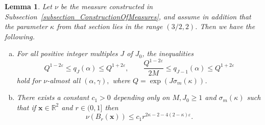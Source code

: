 \documentclass[12pt, reqno]{amsart}
\newtheorem{lemma}[thm]{Lemma}
\theoremstyle{definition}
\theoremstyle{remark}
\numberwithin{equation}{section}
\def\alp{{\alpha}} \def\bfalp{{\boldsymbol \alpha}}
\def\gam{{\gamma}} \def\Gam{{\Gamma}}
\def\kap{{\kappa}}
\def\sig{{\sigma}} \def\Sig{{\Sigma}} \def\bfsig{{\boldsymbol \sig}}
\def\eps{\varepsilon}
\def\le{\leqslant} \def\ge{\geqslant}
\def\ls{\leqslant} \def\gs{\geqslant}
\def \sig{{\sigma}}
\def \bR {\mathbb R}
\def \bx {\mathbf x}
\begin{document}
\begin{lemma} \label{lem_FD}  Let $\nu$ be the measure constructed in Subsection~\ref{subsection_ConstructionOfMeasures}, and assume in addition that the parameter $\kap$ from that section lies in the range $(3/2,2)$. Then we have the following.

\begin{enumerate}[(a)]
\item \label{point_sizeQJ} For all positive integer multiples $J$ of $J_0$, the inequalities
\begin{equation} \label{denominator_bounds}
	Q^{1-2\eps} \le q_J(\alp) \le Q^{1+2\eps},
	\qquad
	\frac{Q^{1-2\eps}}{2M}
	\le q_{J-1}(\alp) \le Q^{1+2\eps} 
\end{equation}
hold for $\nu$-almost all $(\alp,\gam),$ where $Q = \exp(J \sig_m(\kap))$.

\item \label{point_dimFrostman} There exists a constant $c_1>0$ depending only on $M, J_0 \gs 1$ and $\sig_m(\kap)$ such that if $\bx \in \bR^2$ and $r \in (0,1]$ then
\[
\nu(B_r(\bx)) \ls c_1 r^{2\kappa-2-4(2-\kap)\varepsilon}.
\]
\end{enumerate}
\end{lemma}
\end{document}
